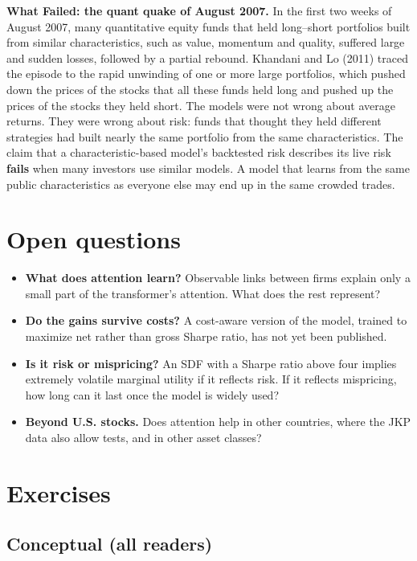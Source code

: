 \begin{callout}
\textbf{What Failed: the quant quake of August 2007.} In the first two weeks of August 2007, many quantitative equity funds that held long--short portfolios built from similar characteristics, such as value, momentum and quality, suffered large and sudden losses, followed by a partial rebound. Khandani and Lo (2011) traced the episode to the rapid unwinding of one or more large portfolios, which pushed down the prices of the stocks that all these funds held long and pushed up the prices of the stocks they held short. The models were not wrong about average returns. They were wrong about risk: funds that thought they held different strategies had built nearly the same portfolio from the same characteristics. The claim that a characteristic-based model's backtested risk describes its live risk \textbf{fails} when many investors use similar models. A model that learns from the same public characteristics as everyone else may end up in the same crowded trades.
\end{callout}

\section{Open questions}
\label{sec:20-open}

\begin{itemize}
  \item \textbf{What does attention learn?} Observable links between firms explain only a small part of the transformer's attention. What does the rest represent?
  \item \textbf{Do the gains survive costs?} A cost-aware version of the model, trained to maximize net rather than gross Sharpe ratio, has not yet been published.
  \item \textbf{Is it risk or mispricing?} An SDF with a Sharpe ratio above four implies extremely volatile marginal utility if it reflects risk. If it reflects mispricing, how long can it last once the model is widely used?
  \item \textbf{Beyond U.S. stocks.} Does attention help in other countries, where the JKP data also allow tests, and in other asset classes?
\end{itemize}

\section*{Exercises}

\subsection*{Conceptual (all readers)}

